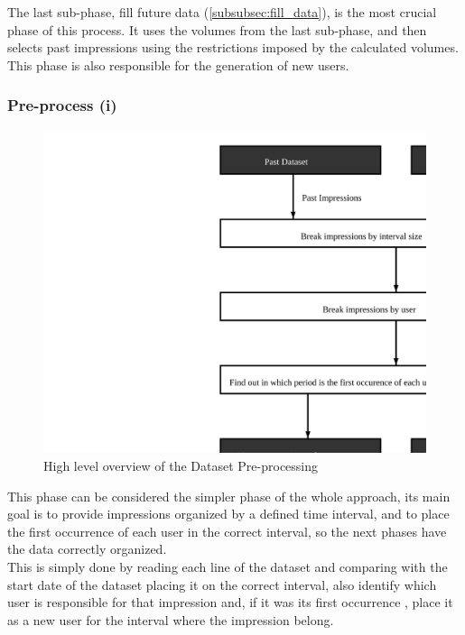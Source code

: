 The last sub-phase, fill future data (\ref{subsubsec:fill_data}), is the most
crucial phase of this process. It uses the volumes from the last sub-phase, and
then selects past impressions using the restrictions imposed by the calculated volumes. This
phase is also responsible for the generation of new users.

\subsubsection{Pre-process (i)}\label{subsubsec:pre_process}

\begin{figure}[h] \begin{center} \leavevmode
\includegraphics[]{pre_processing_i} \caption{ High level overview
of the Dataset Pre-processing} \label{fig:pre_processing_i} \end{center} \end{figure}

This phase can be considered the simpler phase of the whole approach, its main
goal is to provide impressions organized by a defined time interval, and to
place the first occurrence of each user in the correct interval, so the next
phases have the data correctly organized.
\\

This is simply done by reading each line of the dataset and comparing with the
start date of the dataset placing it on the correct interval, also identify
which user is responsible for that impression and, if it was its first occurrence
, place it as a new user for the interval where the impression belong.


